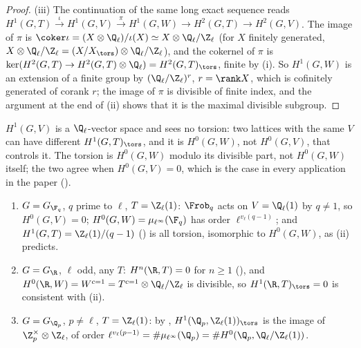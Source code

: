\begin{proof}
(iii) The continuation of the same long exact sequence reads $H^1(G,T)\xrightarrow{\iota}H^1(G,V)\xrightarrow{\pi}H^1(G,W)\to H^2(G,T)\to H^2(G,V)$. The image of $\pi$
is $\coker\iota=(X\otimes\Q_\ell)/\iota(X)\simeq X\otimes\Q_\ell/\Z_\ell$ (for $X$ finitely generated, $X\otimes\Q_\ell/\Z_\ell=(X/X_{\tors})\otimes\Q_\ell/\Z_\ell$), and the cokernel of $\pi$ is
$\ker(H^2(G,T)\to H^2(G,T)\otimes\Q_\ell)=H^2(G,T)_{\tors}$, finite by (i). So $H^1(G,W)$ is an extension of a finite group by $(\Q_\ell/\Z_\ell)^r$, $r=\rank X$, which is
cofinitely generated of corank $r$; the image of $\pi$ is divisible of finite index, and the argument at the end of (ii) shows that it is the maximal divisible
subgroup.
\end{proof}

\begin{warning}\label{warn:galcoh:torsion}
$H^1(G,V)$ is a $\Q_\ell$-vector space and sees no torsion: two lattices with the same $V$ can have different $H^1(G,T)_{\tors}$, and it is $H^0(G,W)$, not $H^0(G,V)$,
that controls it. The torsion is $H^0(G,W)$ modulo its divisible part, not $H^0(G,W)$ itself; the two agree when $H^0(G,V)=0$, which is the case in every application
in the paper ().
\end{warning}

\begin{example}\label{ex:galcoh:tvw-examples}
\begin{enumerate}[label=(\alph*)]
\item $G=G_{\F_q}$, $q$ prime to $\ell$, $T=\Z_\ell(1)$: $\Frob_q$ acts on $V=\Q_\ell(1)$ by $q\ne1$, so $H^0(G,V)=0$; $H^0(G,W)=\mu_{\ell^\infty}(\F_q)$ has order $\ell^{v_\ell(q-1)}$; and
$H^1(G,T)=\Z_\ell(1)/(q-1)$ () is all torsion, isomorphic to $H^0(G,W)$, as (ii) predicts.
\item $G=G_\R$, $\ell$ odd, any $T$: $H^n(\R,T)=0$ for $n\ge1$ (), and $H^0(\R,W)=W^{c=1}=T^{c=1}\otimes\Q_\ell/\Z_\ell$ is divisible, so
$H^1(\R,T)_{\tors}=0$ is consistent with (ii).
\item $G=G_{\Q_p}$, $p\ne\ell$, $T=\Z_\ell(1)$: by , $H^1(\Q_p,\Z_\ell(1))_{\tors}$ is the image of $\Z_p^\times\otimes\Z_\ell$, of order
$\ell^{v_\ell(p-1)}=\#\mu_{\ell^\infty}(\Q_p)=\#H^0(\Q_p,\Q_\ell/\Z_\ell(1))$.
\end{enumerate}
\end{example}

